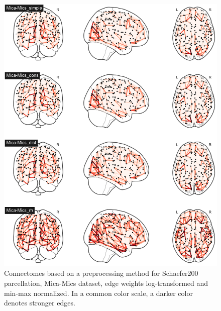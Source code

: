 \begin{figure}[p]
  \begin{center}
    \includegraphics[width=\textwidth]{images/manually_created/mica.png}
  \end{center}
  \caption[Connectomes based on preprocessing method]{Connectomes based on a preprocessing method for Schaefer200 parcellation, Mica-Mics dataset, edge weights log-transformed and min-max normalized. In a common color scale, a darker color denotes stronger edges.}
  \label{fig:connectomes_mica}
\end{figure}

